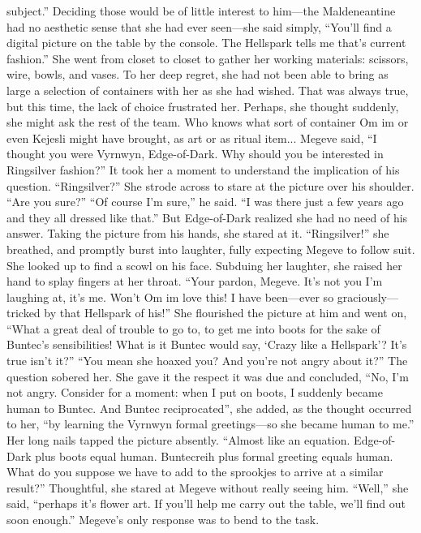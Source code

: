 \documentclass[9pt]{article}
\begin{document}
subject.” Deciding those would be of little interest to him—the Maldeneantine had no aesthetic sense that
she had ever seen—she said simply, “You’ll find a digital picture on the table by the console. The
Hellspark tells me that’s current fashion.” She went from closet to closet to gather her working materials:
scissors, wire, bowls, and vases.
To her deep regret, she had not been able to bring as large a selection of containers with her as she
had wished. That was always true, but this time, the lack of choice frustrated her. Perhaps, she thought
suddenly, she might ask the rest of the team. Who knows what sort of container Om im or even Kejesli
might have brought, as art or as ritual item...
Megeve said, “I thought you were Vyrnwyn, Edge-of-Dark. Why should you be interested in
Ringsilver fashion?”
It took her a moment to understand the implication of his question. “Ringsilver?” She strode across to
stare at the picture over his shoulder. “Are you sure?”
“Of course I’m sure,” he said. “I was there just a few years ago and they all dressed like that.”
But Edge-of-Dark realized she had no need of his answer. Taking the picture from his hands, she
stared at it. “Ringsilver!” she breathed, and promptly burst into laughter, fully expecting Megeve to
follow suit. She looked up to find a scowl on his face.
Subduing her laughter, she raised her hand to splay fingers at her throat. “Your pardon, Megeve. It’s
not you I’m laughing at, it’s me. Won’t Om im love this! I have been—ever so graciously—tricked by
that Hellspark of his!”
She flourished the picture at him and went on, “What a great deal of trouble to go to, to get me into
boots for the sake of Buntec’s sensibilities! What is it Buntec would say, ‘Crazy like a Hellspark’? It’s
true isn’t it?”
“You mean she hoaxed you? And you’re not angry about it?”
The question sobered her. She gave it the respect it was due and concluded, “No, I’m not angry.
Consider for a moment: when I put on boots, I suddenly became human to Buntec. And Buntec
reciprocated”, she added, as the thought occurred to her, “by learning the Vyrnwyn formal greetings—so
she became human to me.”
Her long nails tapped the picture absently. “Almost like an equation. Edge-of-Dark plus boots equal
human. Buntecreih plus formal greeting equals human. What do you suppose we have to add to the
sprookjes to arrive at a similar result?” Thoughtful, she stared at Megeve without really seeing him.
“Well,” she said, “perhaps it’s flower art. If you’ll help me carry out the table, we’ll find out soon
enough.”
Megeve’s only response was to bend to the task.
\end{document}

